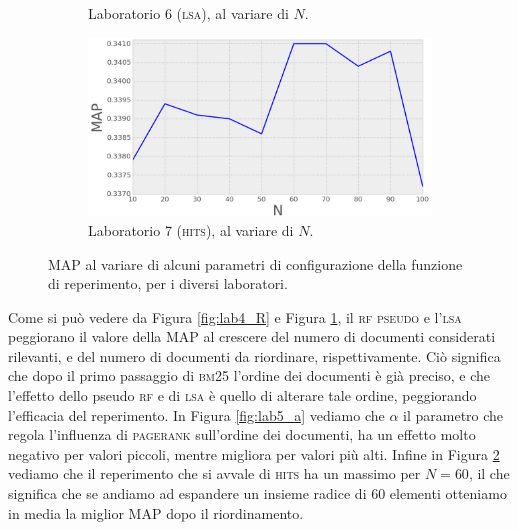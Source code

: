 \begin{figure}
\begin{subfigure}[htpb]{0.475\textwidth}
		\caption[]%
		{{\small Laboratorio 6 (\textsc{lsa}), al variare di $N$.}}    
		\label{fig:lab6_Nd}
	\end{subfigure}
	\quad
	\begin{subfigure}[htpb]{0.475\textwidth}   
		\centering 
		\includegraphics[width=\textwidth]{figures/lab7_N.png}
		\caption[]%
		{{\small Laboratorio 7 (\textsc{hits}), al variare di $N$.}}    
		\label{fig:lab7_Nd}
	\end{subfigure}
        \caption[ The average and standard deviation of claboratorioritical parameters ]
        {\small MAP al variare di alcuni parametri di configurazione della funzione di reperimento, per i diversi laboratori.} 
        \label{fig:map_all}
\end{figure}
Come si pu\`o vedere da Figura \ref{fig:lab4_R} e Figura \ref{fig:lab6_Nd}, il \textsc{rf pseudo} e l'\textsc{lsa} peggiorano il valore della MAP al crescere del numero di documenti considerati rilevanti, e del numero di documenti da riordinare, rispettivamente. Ci\`o significa che dopo il primo passaggio di \textsc{bm25} l'ordine dei documenti \`e gi\`a preciso, e che l'effetto dello pseudo \textsc{rf} e di \textsc{lsa} \`e quello di alterare tale ordine, peggiorando l'efficacia del reperimento. In Figura \ref{fig:lab5_a} vediamo che $\alpha$ il parametro che regola l'influenza di \textsc{pagerank} sull'ordine dei documenti, ha un effetto molto negativo per valori piccoli, mentre migliora per valori pi\`u alti. Infine in Figura \ref{fig:lab7_Nd} vediamo che il reperimento che si avvale di \textsc{hits} ha un massimo per $N=60$, il che significa che se andiamo ad espandere un insieme radice di 60 elementi otteniamo in media la miglior MAP dopo il riordinamento.

